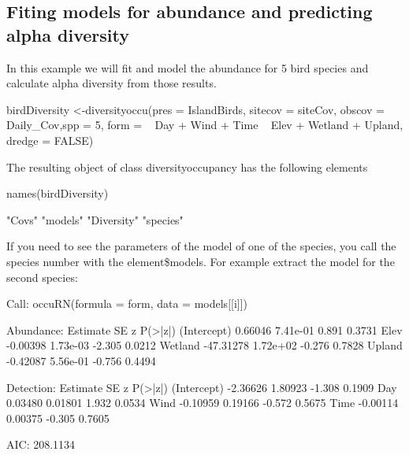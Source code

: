 \documentclass[article]{jss}
\begin{document}
\subsection{Fiting models for abundance and predicting alpha
diversity}\label{fiting-models-for-abundance-and-predicting-alpha-diversity}

In this example we will fit and model the abundance for 5 bird species
and calculate alpha diversity from those results.

\begin{CodeChunk}
\begin{CodeInput}
birdDiversity <-diversityoccu(pres = IslandBirds, sitecov = siteCov,
obscov = Daily_Cov,spp =  5, form = ~ Day + Wind + Time ~ Elev + Wetland + Upland, dredge = FALSE)
\end{CodeInput}
\end{CodeChunk}

The resulting object of class diversityoccupancy has the following
elements

\begin{CodeChunk}
\begin{CodeInput}
names(birdDiversity)
\end{CodeInput}
\begin{CodeOutput}
[1] "Covs"      "models"    "Diversity" "species"  
\end{CodeOutput}
\end{CodeChunk}

If you need to see the parameters of the model of one of the species,
you call the species number with the element\$models. For example
extract the model for the second species:

\begin{CodeChunk}
\begin{CodeOutput}

Call:
occuRN(formula = form, data = models[[i]])

Abundance:
             Estimate       SE      z P(>|z|)
(Intercept)   0.66046 7.41e-01  0.891  0.3731
Elev         -0.00398 1.73e-03 -2.305  0.0212
Wetland     -47.31278 1.72e+02 -0.276  0.7828
Upland       -0.42087 5.56e-01 -0.756  0.4494

Detection:
            Estimate      SE      z P(>|z|)
(Intercept) -2.36626 1.80923 -1.308  0.1909
Day          0.03480 0.01801  1.932  0.0534
Wind        -0.10959 0.19166 -0.572  0.5675
Time        -0.00114 0.00375 -0.305  0.7605

AIC: 208.1134 
\end{CodeOutput}
\end{CodeChunk}
\end{document}
